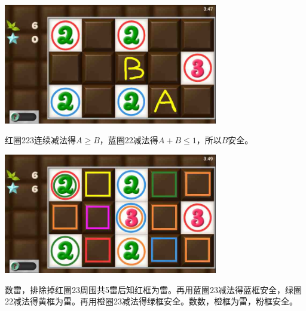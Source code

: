 \subsection{} %
\begin{center}
    \includegraphics[width=0.7\textwidth]{puzzlelow/91-1.jpg}
\end{center}
红圈223连续减法得$A\ge B$，蓝圈22减法得$A+B\le 1$，所以$B$安全。
\begin{center}
    \includegraphics[width=0.7\textwidth]{puzzlelow/91-2.jpg}
\end{center}
数雷，排除掉红圈23周围共5雷后知红框为雷。再用蓝圈23减法得蓝框安全，绿圈22减法得黄框为雷。再用橙圈23减法得绿框安全。数数，橙框为雷，粉框安全。

